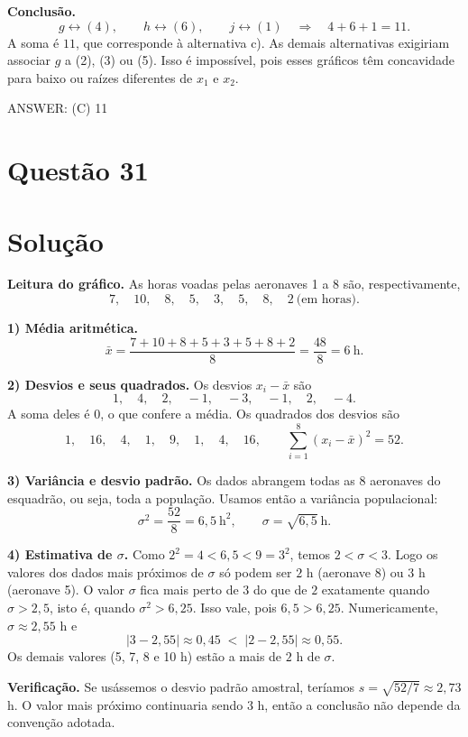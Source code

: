 \documentclass{article}%
\begin{document}
\textbf{Conclusão.}
\[
g\leftrightarrow(4),\qquad h\leftrightarrow(6),\qquad j\leftrightarrow(1)
\quad\Longrightarrow\quad 4+6+1=11.
\]
A soma é $11$, que corresponde à alternativa c). As demais alternativas exigiriam associar $g$ a (2), (3) ou (5). Isso é impossível, pois esses gráficos têm concavidade para baixo ou raízes diferentes de $x_1$ e $x_2$.

ANSWER: (C) 11%
\newpage%
\section*{Questão 31}

\section*{Solução}

\textbf{Leitura do gráfico.} As horas voadas pelas aeronaves 1 a 8 são, respectivamente,
\[
7,\quad 10,\quad 8,\quad 5,\quad 3,\quad 5,\quad 8,\quad 2 \ \text{(em horas)}.
\]

\textbf{1) Média aritmética.}
\[
\bar{x}=\frac{7+10+8+5+3+5+8+2}{8}=\frac{48}{8}=6\ \text{h}.
\]

\textbf{2) Desvios e seus quadrados.} Os desvios $x_i-\bar{x}$ são
\[
1,\quad 4,\quad 2,\quad -1,\quad -3,\quad -1,\quad 2,\quad -4 .
\]
A soma deles é $0$, o que confere a média. Os quadrados dos desvios são
\[
1,\quad 16,\quad 4,\quad 1,\quad 9,\quad 1,\quad 4,\quad 16,
\qquad
\sum_{i=1}^{8}(x_i-\bar{x})^2=52 .
\]

\textbf{3) Variância e desvio padrão.} Os dados abrangem todas as 8 aeronaves do esquadrão, ou seja, toda a população. Usamos então a variância populacional:
\[
\sigma^2=\frac{52}{8}=6{,}5\ \text{h}^2,
\qquad
\sigma=\sqrt{6{,}5}\ \text{h}.
\]

\textbf{4) Estimativa de $\sigma$.} Como $2^2=4<6{,}5<9=3^2$, temos $2<\sigma<3$. Logo os valores dos dados mais próximos de $\sigma$ só podem ser $2$ h (aeronave 8) ou $3$ h (aeronave 5). O valor $\sigma$ fica mais perto de $3$ do que de $2$ exatamente quando $\sigma>2{,}5$, isto é, quando $\sigma^2>6{,}25$. Isso vale, pois $6{,}5>6{,}25$. Numericamente, $\sigma\approx 2{,}55$ h e
\[
|3-2{,}55|\approx 0{,}45 \;<\; |2-2{,}55|\approx 0{,}55 .
\]
Os demais valores (5, 7, 8 e 10 h) estão a mais de $2$ h de $\sigma$.

\textbf{Verificação.} Se usássemos o desvio padrão amostral, teríamos $s=\sqrt{52/7}\approx 2{,}73$ h. O valor mais próximo continuaria sendo $3$ h, então a conclusão não depende da convenção adotada.
\end{document}
